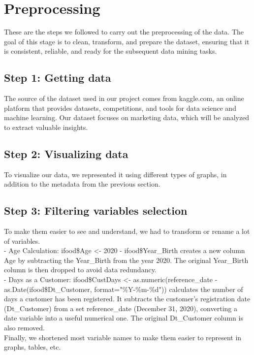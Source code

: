\section{Preprocessing}

These are the steps we followed to carry out the preprocessing of the data. The goal of this stage is to clean, transform, and prepare the dataset, ensuring that it is consistent, reliable, and ready for the subsequent data mining tasks.

\subsection{Step 1: Getting data}
The source of the dataset used in our project comes from kaggle.com, an online platform that provides datasets, competitions, and tools for data science and machine learning. Our dataset focuses on marketing data, which will be analyzed to extract valuable insights.

\subsection{Step 2: Visualizing data}
To visualize our data, we represented it using different types of graphs, in addition to the metadata from the previous section.

\subsection{Step 3: Filtering variables selection}

 To make them easier to see and understand, we had to transform or rename a lot of variables.\\

- Age Calculation: ifood\$Age <- 2020 - ifood\$Year\_Birth creates a new column Age by subtracting the Year\_Birth from the year 2020. The original Year\_Birth column is then dropped to avoid data redundancy.\\
- Days as a Customer: ifood\$CustDays <- as.numeric(reference\_date - as.Date(ifood\$Dt\_Customer, format="\%Y-\%m-\%d")) calculates the number of days a customer has been registered. It subtracts the customer's registration date (Dt\_Customer) from a set reference\_date (December 31, 2020), converting a date variable into a useful numerical one. The original Dt\_Customer column is also removed.\\

Finally, we shortened most variable names to make them easier to represent in graphs, tables, etc.

